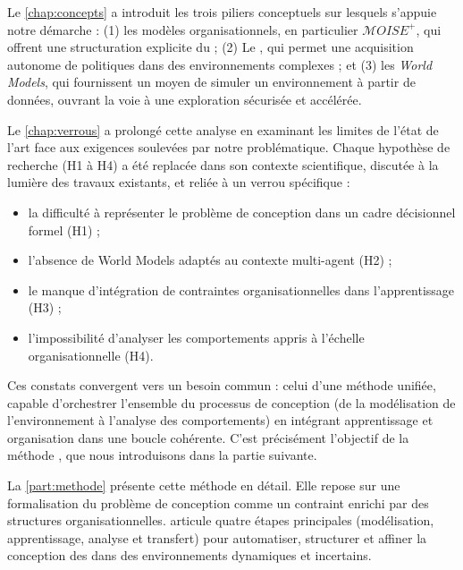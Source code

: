 \medskip

\noindent
Le \autoref{chap:concepts} a introduit les trois piliers conceptuels sur lesquels s'appuie notre démarche : (1) les modèles organisationnels, en particulier \textit{$\mathcal{M}OISE^+$}, qui offrent une structuration explicite du  ; (2) Le , qui permet une acquisition autonome de politiques dans des environnements complexes ; et (3) les \textit{World Models}, qui fournissent un moyen de simuler un environnement à partir de données, ouvrant la voie à une exploration sécurisée et accélérée.

\noindent
Le \autoref{chap:verrous} a prolongé cette analyse en examinant les limites de l'état de l'art face aux exigences soulevées par notre problématique. Chaque hypothèse de recherche (H1 à H4) a été replacée dans son contexte scientifique, discutée à la lumière des travaux existants, et reliée à un verrou spécifique :
\begin{itemize}
    \item la difficulté à représenter le problème de conception dans un cadre décisionnel formel (H1) ;
    \item l'absence de World Models adaptés au contexte multi-agent (H2) ;
    \item le manque d'intégration de contraintes organisationnelles dans l'apprentissage (H3) ;
    \item l'impossibilité d'analyser les comportements appris à l'échelle organisationnelle (H4).
\end{itemize}

\medskip

\noindent
Ces constats convergent vers un besoin commun : celui d'une méthode unifiée, capable d'orchestrer l'ensemble du processus de conception (de la modélisation de l'environnement à l'analyse des comportements) en intégrant apprentissage et organisation dans une boucle cohérente. C'est précisément l'objectif de la méthode , que nous introduisons dans la partie suivante.

\noindent
La \autoref{part:methode} présente cette méthode en détail. Elle repose sur une formalisation du problème de conception comme un  contraint enrichi par des structures organisationnelles.  articule quatre étapes principales (modélisation, apprentissage, analyse et transfert) pour automatiser, structurer et affiner la conception des  dans des environnements dynamiques et incertains.
